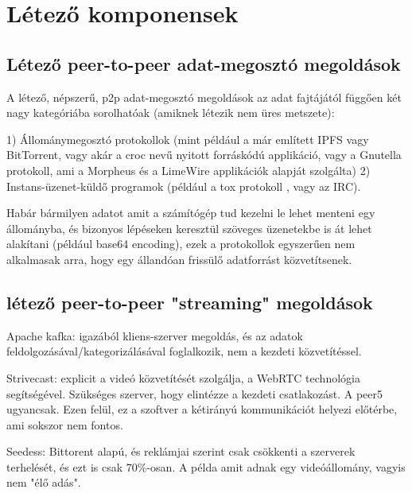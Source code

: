 \chapter{L\'{e}tez\H{o} komponensek}

\section{Létező peer-to-peer adat-megosztó megoldások}

A létező, népszerű, p2p adat-megosztó megoldások az adat fajtájától
függően két nagy kategóriába sorolhatóak (amiknek létezik nem üres metszete):

1) Állománymegosztó protokollok
(mint például a már említett IPFS \citep{Benet} vagy BitTorrent, vagy akár a croc nevű
nyitott forráskódú applikáció, vagy a Gnutella protokoll, ami a Morpheus
és a LimeWire applikációk alapját szolgálta) 2) Instans-üzenet-küldő
programok (például a tox protokoll \citep{enwiki:1159250538}, vagy az IRC).

Habár bármilyen adatot amit a számítógép tud kezelni le lehet menteni egy
állományba, és bizonyos lépéseken keresztül szöveges üzenetekbe is át
lehet alakítani (például base64 encoding), ezek a protokollok egyszerűen
nem alkalmasak arra, hogy egy állandóan frissülő adatforrást
közvetítsenek.

\section{létező peer-to-peer "streaming" megoldások}

Apache kafka: igazából kliens-szerver megoldás, és az adatok
feldolgozásával/kategorizálásával foglalkozik, nem a kezdeti
közvetítéssel.

Strivecast\citep{st}: explicit a videó közvetítését szolgálja, a
WebRTC technológia segítségével. Szükséges szerver, hogy elintézze a
kezdeti csatlakozást. A peer5 ugyancsak. Ezen felül, ez a szoftver a
kétirányú kommunikációt helyezi előtérbe, ami sokszor nem fontos.

Seedess\citep{seed}: Bittorent alapú, és reklámjai szerint csak csökkenti a szerverek
terhelését, és ezt is csak 70\%-osan. A példa amit adnak egy
videóállomány, vagyis nem "élő adás".
